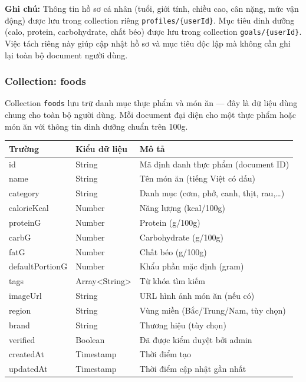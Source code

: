 \textbf{Ghi chú:} Thông tin hồ sơ cá nhân (tuổi, giới tính, chiều cao, cân nặng, mức vận động) được lưu trong collection riêng \texttt{profiles/\{userId\}}. Mục tiêu dinh dưỡng (calo, protein, carbohydrate, chất béo) được lưu trong collection \texttt{goals/\{userId\}}. Việc tách riêng này giúp cập nhật hồ sơ và mục tiêu độc lập mà không cần ghi lại toàn bộ document người dùng.

\subsubsection{Collection: foods}

Collection \texttt{foods} lưu trữ danh mục thực phẩm và món ăn — đây là dữ liệu dùng chung cho toàn bộ người dùng. Mỗi document đại diện cho một thực phẩm hoặc món ăn với thông tin dinh dưỡng chuẩn trên 100g.

\begin{longtable}{|p{3.5cm}|p{3.5cm}|p{7.5cm}|}
    \hline
    \textbf{Trường} & \textbf{Kiểu dữ liệu} & \textbf{Mô tả} \\
    \hline
    \endhead
    \hline
    \endfoot
    id & String & Mã định danh thực phẩm (document ID) \\
    \hline
    name & String & Tên món ăn (tiếng Việt có dấu) \\
    \hline
    category & String & Danh mục (cơm, phở, canh, thịt, rau,\ldots) \\
    \hline
    calorieKcal & Number & Năng lượng (kcal/100g) \\
    \hline
    proteinG & Number & Protein (g/100g) \\
    \hline
    carbG & Number & Carbohydrate (g/100g) \\
    \hline
    fatG & Number & Chất béo (g/100g) \\
    \hline
    defaultPortionG & Number & Khẩu phần mặc định (gram) \\
    \hline
    tags & Array<String> & Từ khóa tìm kiếm \\
    \hline
    imageUrl & String & URL hình ảnh món ăn (nếu có) \\
    \hline
    region & String & Vùng miền (Bắc/Trung/Nam, tùy chọn) \\
    \hline
    brand & String & Thương hiệu (tùy chọn) \\
    \hline
    verified & Boolean & Đã được kiểm duyệt bởi admin \\
    \hline
    createdAt & Timestamp & Thời điểm tạo \\
    \hline
    updatedAt & Timestamp & Thời điểm cập nhật gần nhất \\
    \hline
\end{longtable}

